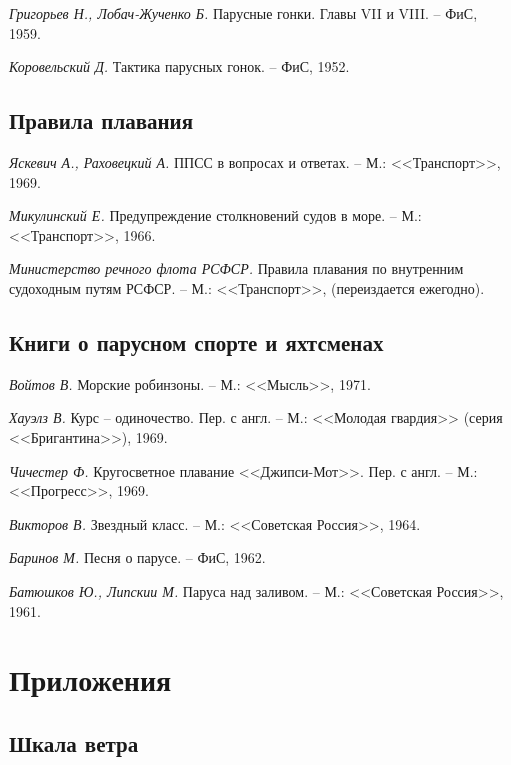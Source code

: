 \documentclass[a4paper, 12pt, twoside, final]{scrbook}
\begin{document}
\textit{Григорьев Н., Лобач-Жученко Б.} Парусные гонки. Главы VII и VIII. \--- ФиС, 1959.

\textit{Коровельский Д.} Тактика парусных гонок. \--- ФиС, 1952.

\section*{Правила плавания}

\textit{Яскевич А., Раховецкий А.} ППСС в вопросах и ответах. \--- М.:
<<Транспорт>>, 1969.

\textit{Микулинский Е.} Предупреждение столкновений судов в море. \--- М.: <<Транспорт>>, 1966.

\textit{Министерство речного флота РСФСР.} Правила плавания по внутренним судоходным путям РСФСР. \--- М.: <<Транспорт>>, (переиздается ежегодно).

\section*{Книги о парусном спорте и яхтсменах}

\textit{Войтов В.} Морские робинзоны. \--- М.: <<Мысль>>, 1971.

\textit{Хауэлз В.} Курс \--- одиночество. Пер. с англ. \--- М.: <<Молодая гвардия>> (серия <<Бригантина>>), 1969.

\textit{Чичестер Ф.} Кругосветное плавание <<Джипси-Мот>>. Пер. с англ.  \--- М.: <<Прогресс>>, 1969.

\textit{Викторов В.} Звездный класс. \--- М.: <<Советская Россия>>, 1964.

\textit{Баринов М.} Песня о парусе. \--- ФиС, 1962.

\textit{Батюшков Ю., Липскии М.} Паруса над заливом. \--- М.: <<Советская Россия>>, 1961.

\backmatter


\chapter{Приложения}

\section{Шкала ветра}
\label{app:3}
\end{document}

